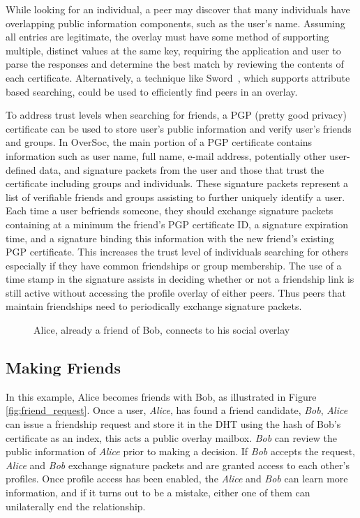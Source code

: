 While looking for an individual, a peer may discover that many individuals have
overlapping public information components, such as the user's name.  Assuming
all entries are legitimate, the overlay must have some method of supporting
multiple, distinct values at the same key, requiring the application and user
to parse the responses and determine the best match by reviewing the contents
of each certificate.  Alternatively, a technique like Sword~\cite{sword}, which
supports attribute based searching, could be used to efficiently find peers in
an overlay.

To address trust levels when searching for friends, a PGP (pretty good privacy)
certificate can be used to store user's public information and verify user's
friends and groups.  In OverSoc, the main portion of a PGP certificate contains
information such as user name, full name, e-mail address, potentially other
user-defined data, and signature packets from the user and those that trust the
certificate including groups and individuals.  These signature packets
represent a list of verifiable friends and groups assisting to further uniquely
identify a user.  Each time a user befriends someone, they should exchange
signature packets containing at a minimum the friend's PGP certificate ID, a
signature expiration time, and a signature binding this information with the
new friend's existing PGP certificate.  This increases the trust level of
individuals searching for others especially if they have common friendships or
group membership.  The use of a time stamp in the signature assists in deciding
whether or not a friendship link is still active without accessing the profile
overlay of either peers.  Thus peers that maintain friendships need to
periodically exchange signature packets.

\begin{figure}
\centering
{}
\caption{Alice, already a friend of Bob, connects to his social overlay}
\label{fig:friendship_join}
\end{figure}

\subsection{Making Friends}

In this example, Alice becomes friends with Bob, as illustrated in Figure
\ref{fig:friend_request}.  Once a user, \textit{Alice}, has found a friend
candidate, \textit{Bob}, \textit{Alice} can issue a friendship request and
store it in the DHT using the hash of Bob's certificate as an index, this acts
a public overlay mailbox.  \textit{Bob} can review the public information of
\textit{Alice} prior to making a decision.  If \textit{Bob} accepts the
request, \textit{Alice} and \textit{Bob} exchange signature packets and are
granted access to each other's profiles.  Once profile access has been enabled,
the \textit{Alice} and \textit{Bob} can learn more information, and if it turns
out to be a mistake, either one of them can unilaterally end the relationship.

